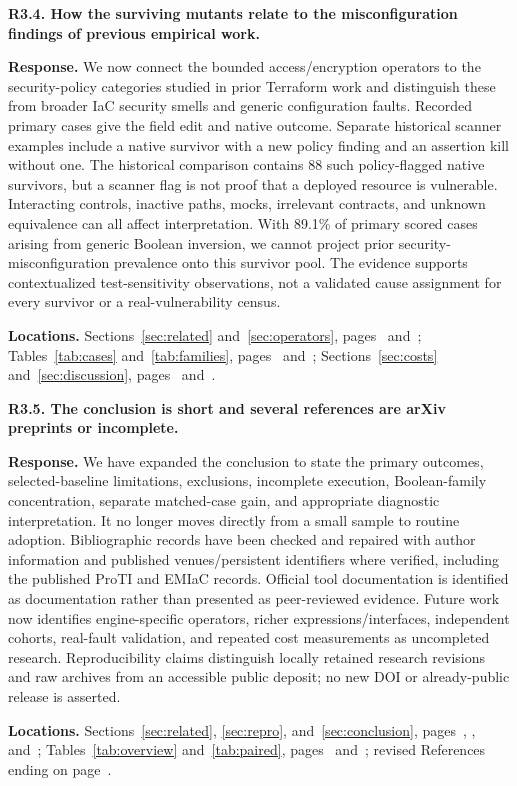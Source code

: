 \medskip
\noindent\textbf{R3.4. How the surviving mutants relate to the misconfiguration findings of previous empirical work.}\label{response:R3.4}\par
\textbf{Response.} We now connect the bounded access/encryption operators to the security-policy categories studied in prior Terraform work and distinguish these from broader IaC security smells and generic configuration faults. Recorded primary cases give the field edit and native outcome. Separate historical scanner examples include a native survivor with a new policy finding and an assertion kill without one. The historical comparison contains 88 such policy-flagged native survivors, but a scanner flag is not proof that a deployed resource is vulnerable. Interacting controls, inactive paths, mocks, irrelevant contracts, and unknown equivalence can all affect interpretation. With 89.1\% of primary scored cases arising from generic Boolean inversion, we cannot project prior security-misconfiguration prevalence onto this survivor pool. The evidence supports contextualized test-sensitivity observations, not a validated cause assignment for every survivor or a real-vulnerability census.\par
\textbf{Locations.} Sections~\ref{sec:related} and~\ref{sec:operators}, pages~\pageref{sec:related} and~\pageref{sec:operators}; Tables~\ref{tab:cases} and~\ref{tab:families}, pages~\pageref{tab:cases} and~\pageref{tab:families}; Sections~\ref{sec:costs} and~\ref{sec:discussion}, pages~\pageref{sec:costs} and~\pageref{sec:discussion}.

\medskip
\noindent\textbf{R3.5. The conclusion is short and several references are arXiv preprints or incomplete.}\label{response:R3.5}\par
\textbf{Response.} We have expanded the conclusion to state the primary outcomes, selected-baseline limitations, exclusions, incomplete execution, Boolean-family concentration, separate matched-case gain, and appropriate diagnostic interpretation. It no longer moves directly from a small sample to routine adoption. Bibliographic records have been checked and repaired with author information and published venues/persistent identifiers where verified, including the published ProTI and EMIaC records. Official tool documentation is identified as documentation rather than presented as peer-reviewed evidence. Future work now identifies engine-specific operators, richer expressions/interfaces, independent cohorts, real-fault validation, and repeated cost measurements as uncompleted research. Reproducibility claims distinguish locally retained research revisions and raw archives from an accessible public deposit; no new DOI or already-public release is asserted.\par
\textbf{Locations.} Sections~\ref{sec:related}, \ref{sec:repro}, and~\ref{sec:conclusion}, pages~\pageref{sec:related}, \pageref{sec:repro}, and~\pageref{sec:conclusion}; Tables~\ref{tab:overview} and~\ref{tab:paired}, pages~\pageref{tab:overview} and~\pageref{tab:paired}; revised References ending on page~\pageref{lastmanuscriptpage}.

